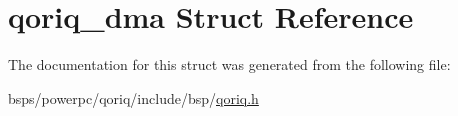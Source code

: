 \hypertarget{structqoriq__dma}{}\section{qoriq\+\_\+dma Struct Reference}
\label{structqoriq__dma}


The documentation for this struct was generated from the following file\+:\begin{DoxyCompactItemize}
\item 
bsps/powerpc/qoriq/include/bsp/\mbox{\hyperlink{qoriq_8h}{qoriq.\+h}}\end{DoxyCompactItemize}
